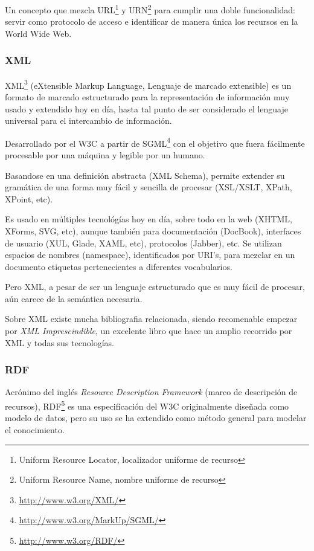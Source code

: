 Un concepto que mezcla URL\footnote{Uniform Resource Locator, localizador uniforme de recurso} 
y URN\footnote{Uniform Resource Name, nombre uniforme de recurso} para cumplir una doble 
funcionalidad: servir como protocolo de acceso e identificar de manera única los recursos 
en la World Wide Web.

\subsubsection{XML}

XML\footnote{\url{http://www.w3.org/XML/}} (eXtensible Markup Language, Lenguaje 
de marcado extensible) es un formato de marcado estructurado para la representación 
de información muy usado y extendido hoy en día, hasta tal punto de ser considerado 
el lenguaje universal para el intercambio de información. 

Desarrollado por el W3C a partir de SGML\footnote{\url{http://www.w3.org/MarkUp/SGML/}} 
con el objetivo que fuera fácilmente procesable por una máquina y legible por un 
humano. 

Basandose en una definición abstracta (XML Schema), permite extender su gramática 
de una forma muy fácil y sencilla de procesar (XSL/XSLT, XPath, XPoint, etc).

Es usado en múltiples tecnológías hoy en día, sobre todo en la web (XHTML, XForms, 
SVG, etc), aunque también para documentación (DocBook), interfaces de usuario (XUL,
Glade, XAML, etc), protocolos (Jabber), etc. Se utilizan espacios de nombres (namespace), 
identificados por URI's, para mezclar en un documento etiquetas pertenecientes a 
diferentes vocabularios.

Pero XML, a pesar de ser un lenguaje estructurado que es muy fácil de procesar, 
aún carece de la semántica necesaria. 

Sobre XML existe mucha bibliografia relacionada, siendo recomenable empezar por
\emph{XML Imprescindible}\cite{XMLNutshell}, un excelente libro que hace un amplio
recorrido por XML y todas sus tecnologías.

\subsubsection{RDF}

Acrónimo del inglés \emph{Resource Description Framework} (marco de descripción 
de recursos), RDF\footnote{\url{http://www.w3.org/RDF/}} es una especificación del 
W3C originalmente diseñada como modelo de datos, pero su uso se ha extendido como
método general para modelar el conocimiento.

